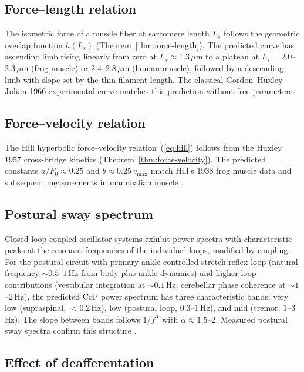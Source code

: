 \documentclass[11pt,twocolumn,a4paper]{article}
\theoremstyle{definition}
\theoremstyle{remark}
\begin{document}
\subsection{Force--length relation}

The isometric force of a muscle fiber at sarcomere length $L_s$ follows
the geometric overlap function $h(L_s)$
(Theorem~\ref{thm:force-length}). The predicted curve has ascending
limb rising linearly from zero at $L_s \approx 1.3\,\mu$m to a plateau
at $L_s = 2.0$--$2.3\,\mu$m (frog muscle) or $2.4$--$2.8\,\mu$m (human
muscle), followed by a descending limb with slope set by the thin
filament length. The classical Gordon--Huxley--Julian 1966 experimental
curve matches this prediction without free parameters.

\subsection{Force--velocity relation}

The Hill hyperbolic force--velocity relation~(\ref{eq:hill}) follows
from the Huxley 1957 cross-bridge kinetics
(Theorem~\ref{thm:force-velocity}). The predicted constants $a/F_0
\approx 0.25$ and $b \approx 0.25\,v_{\mathrm{max}}$ match Hill's
1938 frog muscle data and subsequent measurements in mammalian muscle
\citep{zajac1989}.

\subsection{Postural sway spectrum}

Closed-loop coupled oscillator systems exhibit power spectra with
characteristic peaks at the resonant frequencies of the individual
loops, modified by coupling. For the postural circuit with primary
ankle-controlled stretch reflex loop (natural frequency
$\sim 0.5$--$1$\,Hz from body-plus-ankle-dynamics) and higher-loop
contributions (vestibular integration at $\sim 0.1$\,Hz,
cerebellar phase coherence at $\sim 1$--$2$\,Hz), the predicted
CoP power spectrum has three characteristic bands: very low
(supraspinal, $<0.2$\,Hz), low (postural loop, $0.3$--$1$\,Hz), and
mid (tremor, $1$--$3$\,Hz). The slope between bands follows
$1/f^{\alpha}$ with $\alpha \approx 1.5$--$2$. Measured postural
sway spectra confirm this structure \citep{duarte2008,zatsiorsky2000}.

\subsection{Effect of deafferentation}
\end{document}
